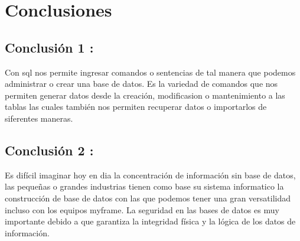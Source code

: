 \documentclass[preprint,12pt]{elsarticle}
\begin{document}
\section{Conclusiones}

\subsection{Conclusión 1 : }	
Con sql nos permite ingresar comandos o sentencias de tal manera que podemos administrar o crear una base de datos.
Es la variedad de comandos que nos permiten generar datos desde la creación, modificasion o mantenimiento a las tablas las cuales también nos permiten recuperar datos o importarlos de siferentes maneras.

\subsection{Conclusión 2 : }	
Es difícil imaginar hoy en dia la concentración de información sin base de datos, las pequeñas o grandes industrias tienen como base su sistema informatico la construcción de base de datos con las que podemos tener una gran versatilidad incluso con los equipos myframe.
La seguridad en las bases de datos es muy importante debido a que garantiza la integridad física y la lógica de los datos de información.


	
	

	
	\newpage
	
		 
\citep{DLake01}  
\citep{DLake02}  
\citep{DWarehouse01}  
\citep{DWarehouse02}   
	
\end{document}
